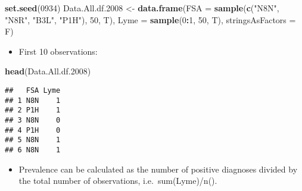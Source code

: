 \documentclass[]{article}
\newenvironment{Shaded}{\begin{snugshade}}{\end{snugshade}}
\newcommand{\DataTypeTok}[1]{\textcolor[rgb]{0.13,0.29,0.53}{#1}}
\newcommand{\DecValTok}[1]{\textcolor[rgb]{0.00,0.00,0.81}{#1}}
\newcommand{\FloatTok}[1]{\textcolor[rgb]{0.00,0.00,0.81}{#1}}
\newcommand{\KeywordTok}[1]{\textcolor[rgb]{0.13,0.29,0.53}{\textbf{#1}}}
\newcommand{\NormalTok}[1]{#1}
\newcommand{\OperatorTok}[1]{\textcolor[rgb]{0.81,0.36,0.00}{\textbf{#1}}}
\newcommand{\StringTok}[1]{\textcolor[rgb]{0.31,0.60,0.02}{#1}}
\providecommand{\tightlist}{%
  \setlength{\itemsep}{0pt}\setlength{\parskip}{0pt}}
\begin{document}
\begin{Shaded}
\begin{Highlighting}[]
\KeywordTok{set.seed}\NormalTok{(}\DecValTok{0934}\NormalTok{)}
\NormalTok{Data.All.df}\FloatTok{.2008}\NormalTok{ <-}\StringTok{ }\KeywordTok{data.frame}\NormalTok{(}\DataTypeTok{FSA =} \KeywordTok{sample}\NormalTok{(}\KeywordTok{c}\NormalTok{(}\StringTok{"N8N"}\NormalTok{, }\StringTok{"N8R"}\NormalTok{, }\StringTok{"B3L"}\NormalTok{, }\StringTok{"P1H"}\NormalTok{), }\DecValTok{50}\NormalTok{, T),}
                               \DataTypeTok{Lyme =} \KeywordTok{sample}\NormalTok{(}\DecValTok{0}\OperatorTok{:}\DecValTok{1}\NormalTok{, }\DecValTok{50}\NormalTok{, T),}
                               \DataTypeTok{stringsAsFactors =}\NormalTok{ F)}
\end{Highlighting}
\end{Shaded}

\begin{itemize}
\tightlist
\item
  First 10 observations:
\end{itemize}

\begin{Shaded}
\begin{Highlighting}[]
\KeywordTok{head}\NormalTok{(Data.All.df}\FloatTok{.2008}\NormalTok{)}
\end{Highlighting}
\end{Shaded}

\begin{verbatim}
##   FSA Lyme
## 1 N8N    1
## 2 P1H    1
## 3 N8N    0
## 4 P1H    0
## 5 N8N    1
## 6 N8N    1
\end{verbatim}

\begin{itemize}
\tightlist
\item
  Prevalence can be calculated as the number of positive diagnoses
  divided by the total number of observations, i.e.~sum(Lyme)/n().
\end{itemize}

\begin{Shaded}
\end{Shaded}
\end{document}
